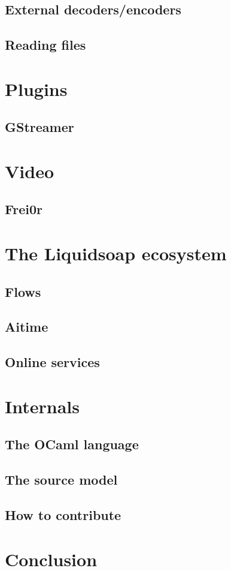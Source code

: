 \documentclass{book}
\begin{document}
\section{External decoders/encoders}

\section{Reading files}

\chapter{Plugins}
\section{GStreamer}

\chapter{Video}

\section{Frei0r}

\chapter{The Liquidsoap ecosystem}
\section{Flows}

\section{Aitime}

\section{Online services}

\chapter{Internals}
\section{The OCaml language}

\section{The source model}

\section{How to contribute}

\chapter{Conclusion}
\end{document}
